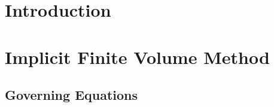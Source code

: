 

\section{Introduction}
\label{sec:intro}


\section{Implicit Finite Volume Method}
\label{sec:CFV}

\newcommand{\trans}{^\mathrm{T}}
\newcommand{\U}{\mathbf{U}}
\newcommand{\F}{\mathbf{F}}
\newcommand{\x}{\mathbf{x}}
\newcommand{\OO}{\mathbf{\Omega}}
\newcommand{\UM}{\overline{\U}}
\newcommand{\Fn}{\tilde{\F}}
\newcommand{\n}{\mathbf{n}}
\newcommand{\uu}{\overline{\mathbf{U}}}
\newcommand{\R}{\mathbf{R}}
\newcommand{\inc}{\mathrm\Delta}
\newcommand{\Tau}{\mathrm{T}}
\renewcommand{\real}{\mathrm{Re}}
\newcommand{\imag}{\mathrm{Im}}

\newcommand{\CFLt}{\text{CFL}_t}
\newcommand{\CFLtau}{\text{CFL}_\tau}

\newcommand{\eeqref}[1]{Eq.\eqref{#1}}
\newcommand{\um}{\overline{u}}
\newcommand{\us}{\mathbf{u}}
\newcommand{\SAll}{\mathcal{S}}

\newcommand{\FF}{\mathcal{F}}

\newcommand{\eye}{\mathbf{I}}

\subsection{Governing Equations}
\label{ssec:GovEq}

